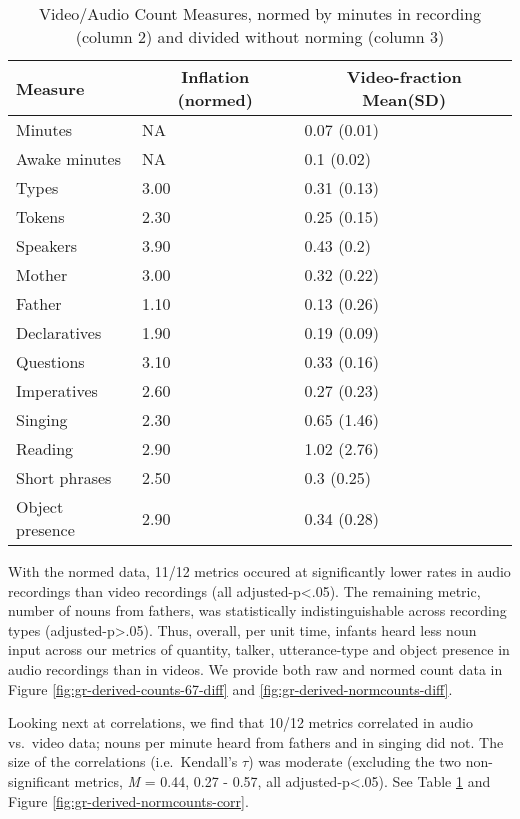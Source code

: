 \documentclass[floatsintext,man]{apa6}
\theoremstyle{definition}
\theoremstyle{definition}
\theoremstyle{definition}
\theoremstyle{remark}
\begin{document}
\begin{table}[tbp]
\begin{center}
\begin{threeparttable}
\caption{\label{tab:normtable}Video/Audio Count Measures, normed by minutes in recording (column 2) and divided without norming (column 3)}
\small{
\begin{tabular}{lll}
\toprule
Measure & \multicolumn{1}{c}{Inflation (normed)} & \multicolumn{1}{c}{Video-fraction Mean(SD)}\\
\midrule
Minutes & NA & 0.07 (0.01)\\
Awake minutes & NA & 0.1 (0.02)\\
Types & 3.00 & 0.31 (0.13)\\
Tokens & 2.30 & 0.25 (0.15)\\
Speakers & 3.90 & 0.43 (0.2)\\
Mother & 3.00 & 0.32 (0.22)\\
Father & 1.10 & 0.13 (0.26)\\
Declaratives & 1.90 & 0.19 (0.09)\\
Questions & 3.10 & 0.33 (0.16)\\
Imperatives & 2.60 & 0.27 (0.23)\\
Singing & 2.30 & 0.65 (1.46)\\
Reading & 2.90 & 1.02 (2.76)\\
Short phrases & 2.50 & 0.3 (0.25)\\
Object presence & 2.90 & 0.34 (0.28)\\
\bottomrule
\end{tabular}
}
\end{threeparttable}
\end{center}
\end{table}

With the normed data, 11/12 metrics occured at significantly lower rates
in audio recordings than video recordings (all
adjusted-p\textless{}.05). The remaining metric, number of nouns from
fathers, was statistically indistinguishable across recording types
(adjusted-p\textgreater{}.05). Thus, overall, per unit time, infants
heard less noun input across our metrics of quantity, talker,
utterance-type and object presence in audio recordings than in videos.
We provide both raw and normed count data in Figure
\ref{fig:gr-derived-counts-67-diff} and
\ref{fig:gr-derived-normcounts-diff}.

Looking next at correlations, we find that 10/12 metrics correlated in
audio vs.~video data; nouns per minute heard from fathers and in singing
did not. The size of the correlations (i.e.~Kendall's \(\tau\)) was
moderate (excluding the two non-significant metrics, \emph{M} = 0.44,
0.27 - 0.57, all adjusted-p\textless{}.05). See Table
\ref{tab:normtable} and Figure \ref{fig:gr-derived-normcounts-corr}.
\end{document}
